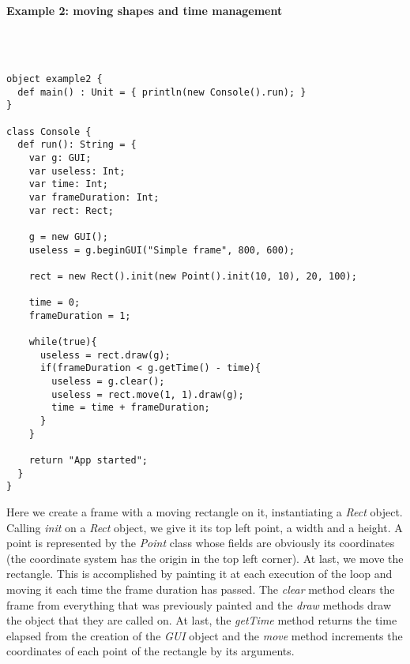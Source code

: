 \paragraph{Example 2: moving shapes and time management}\mbox{}\\
\begin{lstlisting}

object example2 {
  def main() : Unit = { println(new Console().run); }
}

class Console {
  def run(): String = {
    var g: GUI;
    var useless: Int;
    var time: Int;
    var frameDuration: Int;
    var rect: Rect;
		
    g = new GUI();
    useless = g.beginGUI("Simple frame", 800, 600);

    rect = new Rect().init(new Point().init(10, 10), 20, 100);

    time = 0;
    frameDuration = 1;
		
    while(true){
      useless = rect.draw(g);
      if(frameDuration < g.getTime() - time){
        useless = g.clear();
        useless = rect.move(1, 1).draw(g);
        time = time + frameDuration;
      }
    }
		
    return "App started";
  }
}
\end{lstlisting}

Here we create a frame with a moving rectangle on it, instantiating a \textit{Rect} object.
Calling \textit{init} on a \textit{Rect} object, we give it its top left point, a width and a height.
A point is represented by the \textit{Point} class whose fields are obviously its coordinates (the coordinate system has the origin in the top left corner).
At last, we move the rectangle. This is accomplished by painting it at each execution of the loop and moving it each time the frame duration has passed.
The \textit{clear} method clears the frame from everything that was previously painted and the \textit{draw} methods draw the object that they are called on. 
At last, the \textit{getTime} method returns the time elapsed from the creation of the \textit{GUI} object and the \textit{move} method increments the coordinates of each point of the rectangle by its arguments.

